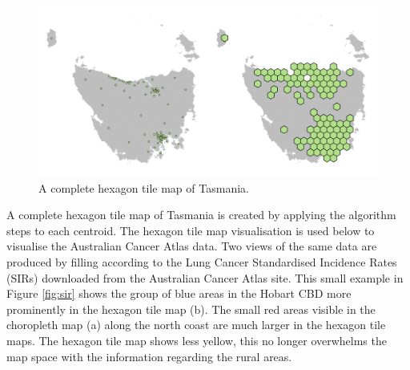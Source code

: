 \documentclass[
]{jss}
\begin{document}
\begin{CodeChunk}
\begin{figure}

{\centering \includegraphics[width=1\linewidth]{figures/6allocate} 

}

\caption[A complete hexagon tile map of Tasmania]{A complete hexagon tile map of Tasmania.}\label{fig:buffs}
\end{figure}
\end{CodeChunk}

A complete hexagon tile map of Tasmania is created by applying the
algorithm steps to each centroid. The hexagon tile map visualisation is
used below to visualise the Australian Cancer Atlas data. Two views of
the same data are produced by filling according to the Lung Cancer
Standardised Incidence Rates (SIRs) downloaded from the Australian
Cancer Atlas site. This small example in Figure \ref{fig:sir} shows the
group of blue areas in the Hobart CBD more prominently in the hexagon
tile map (b). The small red areas visible in the choropleth map (a)
along the north coast are much larger in the hexagon tile maps. The
hexagon tile map shows less yellow, this no longer overwhelms the map
space with the information regarding the rural areas.
\end{document}
